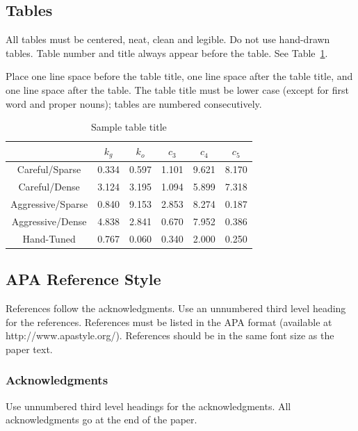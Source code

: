 \documentclass{article}
\begin{document}
\subsection{Tables}

All tables must be centered, neat, clean and legible. Do not use hand-drawn
tables. Table number and title always appear before the table. See
Table~\ref{sample-table}.

Place one line space before the table title, one line space after the table
title, and one line space after the table. The table title must be lower case
(except for first word and proper nouns); tables are numbered consecutively.

\begin{table}[t]
\caption{Sample table title} \label{sample-table}
\begin{center}
\begin{tabular}{|c|c|c|c|c|c|}
  \hline
   & $k_{g}$ & $k_{o}$ & $c_{3}$ & $c_{4}$ & $c_{5}$ \\
  \hline\hline
  Careful/Sparse & 0.334 & 0.597 & 1.101 & 9.621 & 8.170 \\ \hline
  Careful/Dense & 3.124 & 3.195 & 1.094 & 5.899 & 7.318 \\ \hline
  Aggressive/Sparse & 0.840 & 9.153 & 2.853 & 8.274 & 0.187 \\ \hline
  Aggressive/Dense & 4.838 & 2.841 & 0.670 & 7.952 & 0.386 \\ \hline
  Hand-Tuned & 0.767 & 0.060 & 0.340 & 2.000 & 0.250 \\
  \hline
\end{tabular}
\end{center}
\end{table}

\subsection{APA Reference Style}

References follow the acknowledgments. Use an unnumbered third level
heading for the references. References must be listed in the APA
format (available at http://www.apastyle.org/). References should be
in the same font size as the paper text.

\subsubsection*{Acknowledgments}
Use unnumbered third level headings for the acknowledgments. All
acknowledgments go at the end of the paper.



\end{document}
